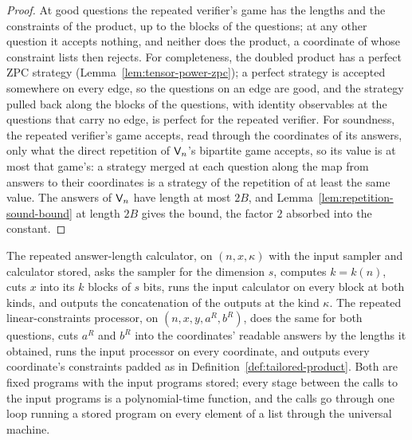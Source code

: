 \begin{proof}
\leanok
At good questions the repeated verifier's game has the lengths and the constraints of the
product, up to the blocks of the questions; at any other question it accepts nothing, and
neither does the product, a coordinate of whose constraint lists then rejects. For
completeness, the doubled product has a perfect ZPC strategy (Lemma~\ref{lem:tensor-power-zpc});
a perfect strategy is accepted somewhere on every edge, so the questions on an edge are good,
and the strategy pulled back along the blocks of the questions, with identity observables at
the questions that carry no edge, is perfect for the repeated verifier. For soundness, the
repeated verifier's game accepts, read through the coordinates of its answers, only what the
direct repetition of $\mathsf{V}_n$'s bipartite game accepts, so its value is at most that
game's: a strategy merged at each question along the map from answers to their coordinates is
a strategy of the repetition of at least the same value. The answers of $\mathsf{V}_n$ have
length at most $2B$, and Lemma~\ref{lem:repetition-sound-bound} at length $2B$ gives the bound,
the factor $2$ absorbed into the constant.
\end{proof}

\begin{definition}
\label{def:tailored-rep-programs}
\leanok
The repeated answer-length calculator, on $(n, x, \kappa)$ with the input sampler and calculator
stored, asks the sampler for the dimension $s$, computes $k = k(n)$, cuts $x$ into its $k$
blocks of $s$ bits, runs the input calculator on every block at both kinds, and outputs the
concatenation of the outputs at the kind $\kappa$. The repeated linear-constraints processor, on
$(n, x, y, a^R, b^R)$, does the same for both questions, cuts $a^R$ and $b^R$ into the
coordinates' readable answers by the lengths it obtained, runs the input processor on every
coordinate, and outputs every coordinate's constraints padded as in
Definition~\ref{def:tailored-product}. Both are fixed programs with the input programs stored;
every stage between the calls to the input programs is a polynomial-time function, and the calls
go through one loop running a stored program on every element of a list through the universal
machine.
\end{definition}

